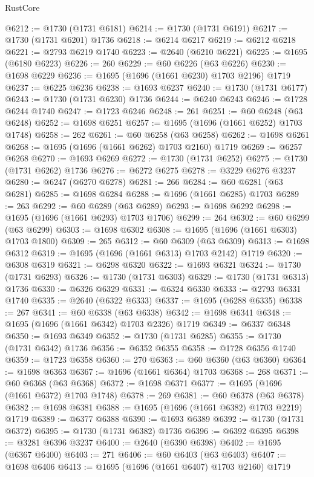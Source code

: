 \begin{lexlean}{RustCore}
\begin{coremodule}
@6212 := @1730 (@1731 @6181)
@6214 := @1730 (@1731 @6191)
@6217 := @1730 (@1731 @6201) @1736
@6218 := @6214 @6217
@6219 := @6212 @6218
@6221 := @2793 @6219 @1740
@6223 := @2640 (@6210 @6221)
@6225 := @1695 (@6180 @6223)
@6226 := 260
@6229 := @60 @6226 (@63 @6226)
@6230 := @1698 @6229
@6236 := @1695 (@1696 (@1661 @6230) @1703 @2196) @1719
@6237 := @6225 @6236
@6238 := @1693 @6237
@6240 := @1730 (@1731 @6177)
@6243 := @1730 (@1731 @6230) @1736
@6244 := @6240 @6243
@6246 := @1728 @6244 @1740
@6247 := @1723 @6246
@6248 := 261
@6251 := @60 @6248 (@63 @6248)
@6252 := @1698 @6251
@6257 := @1695 (@1696 (@1661 @6252) @1703 @1748)
@6258 := 262
@6261 := @60 @6258 (@63 @6258)
@6262 := @1698 @6261
@6268 := @1695 (@1696 (@1661 @6262) @1703 @2160) @1719
@6269 := @6257 @6268
@6270 := @1693 @6269
@6272 := @1730 (@1731 @6252)
@6275 := @1730 (@1731 @6262) @1736
@6276 := @6272 @6275
@6278 := @3229 @6276 @3237
@6280 := @6247 (@6270 @6278)
@6281 := 266
@6284 := @60 @6281 (@63 @6281)
@6285 := @1698 @6284
@6288 := @1696 (@1661 @6285) @1703
@6289 := 263
@6292 := @60 @6289 (@63 @6289)
@6293 := @1698 @6292
@6298 := @1695 (@1696 (@1661 @6293) @1703 @1706)
@6299 := 264
@6302 := @60 @6299 (@63 @6299)
@6303 := @1698 @6302
@6308 := @1695 (@1696 (@1661 @6303) @1703 @1800)
@6309 := 265
@6312 := @60 @6309 (@63 @6309)
@6313 := @1698 @6312
@6319 := @1695 (@1696 (@1661 @6313) @1703 @2142) @1719
@6320 := @6308 @6319
@6321 := @6298 @6320
@6322 := @1693 @6321
@6324 := @1730 (@1731 @6293)
@6326 := @1730 (@1731 @6303)
@6329 := @1730 (@1731 @6313) @1736
@6330 := @6326 @6329
@6331 := @6324 @6330
@6333 := @2793 @6331 @1740
@6335 := @2640 (@6322 @6333)
@6337 := @1695 (@6288 @6335)
@6338 := 267
@6341 := @60 @6338 (@63 @6338)
@6342 := @1698 @6341
@6348 := @1695 (@1696 (@1661 @6342) @1703 @2326) @1719
@6349 := @6337 @6348
@6350 := @1693 @6349
@6352 := @1730 (@1731 @6285)
@6355 := @1730 (@1731 @6342) @1736
@6356 := @6352 @6355
@6358 := @1728 @6356 @1740
@6359 := @1723 @6358
@6360 := 270
@6363 := @60 @6360 (@63 @6360)
@6364 := @1698 @6363
@6367 := @1696 (@1661 @6364) @1703
@6368 := 268
@6371 := @60 @6368 (@63 @6368)
@6372 := @1698 @6371
@6377 := @1695 (@1696 (@1661 @6372) @1703 @1748)
@6378 := 269
@6381 := @60 @6378 (@63 @6378)
@6382 := @1698 @6381
@6388 := @1695 (@1696 (@1661 @6382) @1703 @2219) @1719
@6389 := @6377 @6388
@6390 := @1693 @6389
@6392 := @1730 (@1731 @6372)
@6395 := @1730 (@1731 @6382) @1736
@6396 := @6392 @6395
@6398 := @3281 @6396 @3237
@6400 := @2640 (@6390 @6398)
@6402 := @1695 (@6367 @6400)
@6403 := 271
@6406 := @60 @6403 (@63 @6403)
@6407 := @1698 @6406
@6413 := @1695 (@1696 (@1661 @6407) @1703 @2160) @1719

\end{coremodule}
\end{lexlean}

